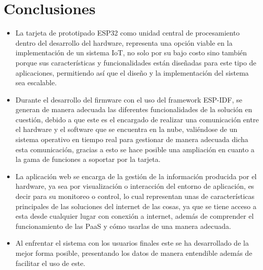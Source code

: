 \chapter{Conclusiones}

\begin{itemize}
	\item La tarjeta de prototipado ESP32 como unidad central de procesamiento dentro del desarrollo del hardware, representa una opción viable en la implementación de un sistema IoT, no solo por su bajo costo sino también porque sus características y funcionalidades están diseñadas para este tipo de aplicaciones, permitiendo así que el diseño y la implementación del sistema sea escalable.
	\item Durante el desarrollo del firmware con el uso del framework ESP-IDF, se generan de manera adecuada las diferentes funcionalidades de la solución en cuestión, debido a que este es el encargado de realizar una comunicación entre el hardware y el software que se encuentra en la nube, valiéndose de un sistema operativo en tiempo real para gestionar de manera adecuada dicha esta comunicación, gracias a esto se hace posible una ampliación en cuanto a la gama de funciones a soportar por la tarjeta. 
	\item La aplicación web se encarga de la gestión de la información producida por el hardware, ya sea por visualización o interacción del entorno de aplicación, es decir para su monitoreo o control, lo cual representan unas de características principales de las soluciones del internet de las cosas, ya que se tiene acceso a esta desde cualquier lugar con conexión a internet, además de comprender el funcionamiento de las PaaS y cómo usarlas de una manera adecuada.
	\item Al enfrentar el sistema con los usuarios finales este se ha desarrollado de la mejor forma posible, presentando los datos de manera entendible además de facilitar el uso de este.
	
\end{itemize}